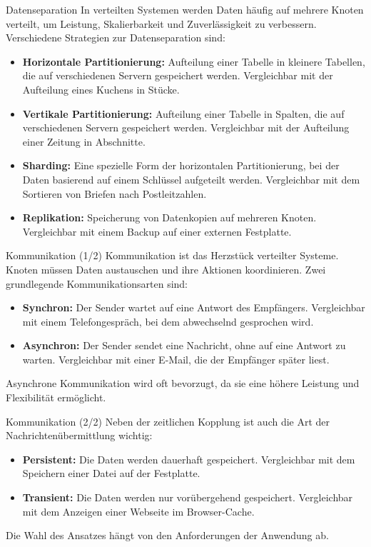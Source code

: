 \documentclass{beamer}
\begin{document}
\begin{frame}{Datenseparation}
    In verteilten Systemen werden Daten häufig auf mehrere Knoten verteilt, um Leistung, Skalierbarkeit und Zuverlässigkeit zu verbessern. Verschiedene Strategien zur Datenseparation sind:
    \begin{itemize}
        \item \textbf{Horizontale Partitionierung:} Aufteilung einer Tabelle in kleinere Tabellen, die auf verschiedenen Servern gespeichert werden. Vergleichbar mit der Aufteilung eines Kuchens in Stücke.
        \item \textbf{Vertikale Partitionierung:} Aufteilung einer Tabelle in Spalten, die auf verschiedenen Servern gespeichert werden. Vergleichbar mit der Aufteilung einer Zeitung in Abschnitte.
        \item \textbf{Sharding:} Eine spezielle Form der horizontalen Partitionierung, bei der Daten basierend auf einem Schlüssel aufgeteilt werden. Vergleichbar mit dem Sortieren von Briefen nach Postleitzahlen.
        \item \textbf{Replikation:} Speicherung von Datenkopien auf mehreren Knoten. Vergleichbar mit einem Backup auf einer externen Festplatte.
    \end{itemize}
\end{frame}

\begin{frame}{Kommunikation (1/2)}
    Kommunikation ist das Herzstück verteilter Systeme. Knoten müssen Daten austauschen und ihre Aktionen koordinieren. Zwei grundlegende Kommunikationsarten sind:
    \begin{itemize}
        \item \textbf{Synchron:} Der Sender wartet auf eine Antwort des Empfängers. Vergleichbar mit einem Telefongespräch, bei dem abwechselnd gesprochen wird.
        \item \textbf{Asynchron:} Der Sender sendet eine Nachricht, ohne auf eine Antwort zu warten. Vergleichbar mit einer E-Mail, die der Empfänger später liest.
    \end{itemize}
    Asynchrone Kommunikation wird oft bevorzugt, da sie eine höhere Leistung und Flexibilität ermöglicht.
\end{frame}

\begin{frame}{Kommunikation (2/2)}
    Neben der zeitlichen Kopplung ist auch die Art der Nachrichtenübermittlung wichtig:
    \begin{itemize}
        \item \textbf{Persistent:} Die Daten werden dauerhaft gespeichert. Vergleichbar mit dem Speichern einer Datei auf der Festplatte.
        \item \textbf{Transient:} Die Daten werden nur vorübergehend gespeichert. Vergleichbar mit dem Anzeigen einer Webseite im Browser-Cache.
    \end{itemize}
    Die Wahl des Ansatzes hängt von den Anforderungen der Anwendung ab.
\end{frame}
\end{document}

